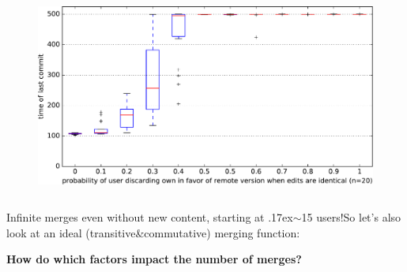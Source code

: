 \documentclass[final,hyperref={pdfpagelabels=false}]{beamer}
\begin{document}
\begin{frame}
\begin{columns}
\begin{column}{.9\textwidth}
\begin{columns}
\begin{column}{.3\textwidth}
\begin{figure}
      \includegraphics[width=\linewidth]{fig/bored_accept_n=20.pdf}
    \end{figure}
  \end{column}

  \end{columns}
  \vspace{10mm}
  \begin{center}
  Infinite merges even without new content, starting at {\raise.17ex\hbox{$\scriptstyle\sim$}}15 users!\hspace{2cm}So let's also look at an ideal (transitive\&commutative) merging function:
  \end{center}

  \vspace{8mm}
  \textbf{How do which factors impact the number of merges?}
  \vspace{5mm}


\end{column}
\end{columns}
\end{frame}
\end{document}
